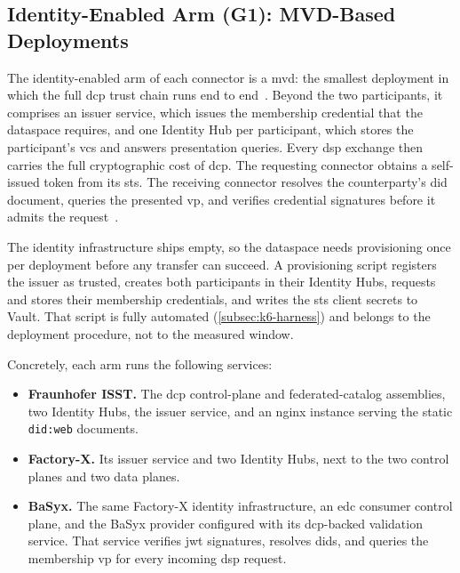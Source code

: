 \subsection{Identity-Enabled Arm (G1): MVD-Based Deployments}\label{subsec:mvd}

The identity-enabled arm of each connector is a \gls{mvd}: the smallest deployment in which the full \gls{dcp} trust chain runs end to end~\citep{eclipseEdcIdentityHub}. Beyond the two participants, it comprises an issuer service, which issues the membership credential that the dataspace requires, and one Identity Hub per participant, which stores the participant's \glspl{vc} and answers presentation queries. Every \gls{dsp} exchange then carries the full cryptographic cost of \gls{dcp}. The requesting connector obtains a self-issued token from its \gls{sts}. The receiving connector resolves the counterparty's \gls{did} document, queries the presented \gls{vp}, and verifies credential signatures before it admits the request~\citep{dcpSpec}.

The identity infrastructure ships empty, so the dataspace needs provisioning once per deployment before any transfer can succeed. A provisioning script registers the issuer as trusted, creates both participants in their Identity Hubs, requests and stores their membership credentials, and writes the \gls{sts} client secrets to Vault. That script is fully automated (\cref{subsec:k6-harness}) and belongs to the deployment procedure, not to the measured window.

Concretely, each arm runs the following services:

\begin{itemize}[leftmargin=*, itemsep=2pt, topsep=4pt]
    \item \textbf{Fraunhofer ISST.} The \gls{dcp} control-plane and federated-catalog assemblies, two Identity Hubs, the issuer service, and an nginx instance serving the static \texttt{did:web} documents.
    \item \textbf{Factory-X.} Its issuer service and two Identity Hubs, next to the two control planes and two data planes.
    \item \textbf{BaSyx.} The same Factory-X identity infrastructure, an \gls{edc} consumer control plane, and the BaSyx provider configured with its \gls{dcp}-backed validation service. That service verifies \gls{jwt} signatures, resolves \glspl{did}, and queries the membership \gls{vp} for every incoming \gls{dsp} request.
\end{itemize}

